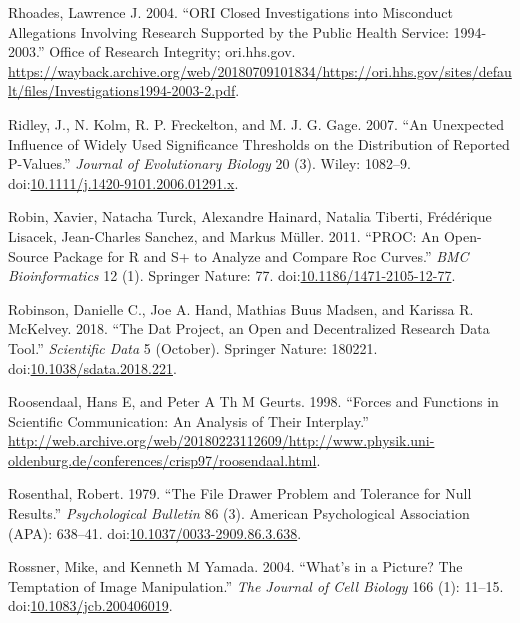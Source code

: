 \documentclass[a5paper]{book}
\begin{document}
\hypertarget{ref-rhoades2004}{}
Rhoades, Lawrence J. 2004. ``ORI Closed Investigations into Misconduct
Allegations Involving Research Supported by the Public Health Service:
1994-2003.'' Office of Research Integrity; ori.hhs.gov.
\url{https://wayback.archive.org/web/20180709101834/https://ori.hhs.gov/sites/default/files/Investigations1994-2003-2.pdf}.

\hypertarget{ref-doi:10.1111ux2fj.1420-9101.2006.01291.x}{}
Ridley, J., N. Kolm, R. P. Freckelton, and M. J. G. Gage. 2007. ``An
Unexpected Influence of Widely Used Significance Thresholds on the
Distribution of Reported P-Values.'' \emph{Journal of Evolutionary
Biology} 20 (3). Wiley: 1082--9.
doi:\href{https://doi.org/10.1111/j.1420-9101.2006.01291.x}{10.1111/j.1420-9101.2006.01291.x}.

\hypertarget{ref-doi:10.1186ux2f1471-2105-12-77}{}
Robin, Xavier, Natacha Turck, Alexandre Hainard, Natalia Tiberti,
Frédérique Lisacek, Jean-Charles Sanchez, and Markus Müller. 2011.
``PROC: An Open-Source Package for R and S+ to Analyze and Compare Roc
Curves.'' \emph{BMC Bioinformatics} 12 (1). Springer Nature: 77.
doi:\href{https://doi.org/10.1186/1471-2105-12-77}{10.1186/1471-2105-12-77}.

\hypertarget{ref-doi:10.1038ux2fsdata.2018.221}{}
Robinson, Danielle C., Joe A. Hand, Mathias Buus Madsen, and Karissa R.
McKelvey. 2018. ``The Dat Project, an Open and Decentralized Research
Data Tool.'' \emph{Scientific Data} 5 (October). Springer Nature:
180221.
doi:\href{https://doi.org/10.1038/sdata.2018.221}{10.1038/sdata.2018.221}.

\hypertarget{ref-roosendaal1998}{}
Roosendaal, Hans E, and Peter A Th M Geurts. 1998. ``Forces and
Functions in Scientific Communication: An Analysis of Their Interplay.''
\url{http://web.archive.org/web/20180223112609/http://www.physik.uni-oldenburg.de/conferences/crisp97/roosendaal.html}.

\hypertarget{ref-doi:10.1037ux2f0033-2909.86.3.638}{}
Rosenthal, Robert. 1979. ``The File Drawer Problem and Tolerance for
Null Results.'' \emph{Psychological Bulletin} 86 (3). American
Psychological Association (APA): 638--41.
doi:\href{https://doi.org/10.1037/0033-2909.86.3.638}{10.1037/0033-2909.86.3.638}.

\hypertarget{ref-doi:10.1083ux2fjcb.200406019}{}
Rossner, Mike, and Kenneth M Yamada. 2004. ``What's in a Picture? The
Temptation of Image Manipulation.'' \emph{The Journal of Cell Biology}
166 (1): 11--15.
doi:\href{https://doi.org/10.1083/jcb.200406019}{10.1083/jcb.200406019}.
\end{document}
